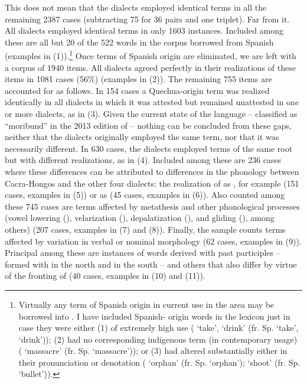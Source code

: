 This does not mean that the dialects employed identical terms in all the remaining 2387 cases (subtracting 75 for 36 pairs and one triplet). Far from it. All dialects employed identical terms in only 1603 instances. Included among these are all but 20 of the 522 words in the corpus borrowed from Spanish (examples in (1)).\footnote{Virtually any term of Spanish origin in current use in the area may be borrowed into \SYQ{}. I have included Spanish- origin words in the lexicon just in case they were either (1) of extremely high use ( `take', `drink' (fr. Sp.  `take', `drink')); (2) had no corresponding indigenous term (in contemporary usage) ( `massacre' (fr. Sp.  `massacre')); or (3) had altered substantially either in their pronunciation or denotation ( `orphan' (fr. Sp.  `orphan');  `shoot' (fr. Sp.  `bullet')).} Once terms of Spanish origin are eliminated, we are left with a corpus of 1940 items. All dialects agreed perfectly in their realizations of these items in 1081 cases (56\%{}) (examples in (2)). The remaining 755 items are accounted for as follows. In 154 cases a Quechua-origin term was realized identically in all dialects in which it was attested but remained unattested in one or more dialects, as in (3). Given the current state of the language -- classified as ``moribund'' in the 2013 edition of \underline{} \citet{ethnologue} -- nothing can be concluded from these gaps, neither that the dialects originally employed the same term, nor that it was necessarily different. In 630 cases, the dialects employed terms of the same root but with different realizations, as in (4). Included among these are 236 cases where these differences can be attributed to differences in the phonology between Cacra-Hongos and the other four dialects: the realization of \textipa{*[r]} as \textipa{[l]}, for example (151 cases, examples in (5)) or  as \textipa{[h]} (45 cases, examples in (6)). Also counted among these 745 cases are terms affected by metathesis and other phonological processes (vowel lowering (), velarization (), depalatization (), and gliding (), among others) (207 cases, examples in (7) and (8)). Finally, the sample counts terms affected by variation in verbal or nominal morphology (62 cases, examples in (9)). Principal among these are instances of words derived with past participles -- formed with  in the north and  in the south -- and others that also differ by virtue of the fronting of  (40 cases, examples in (10) and (11)).

